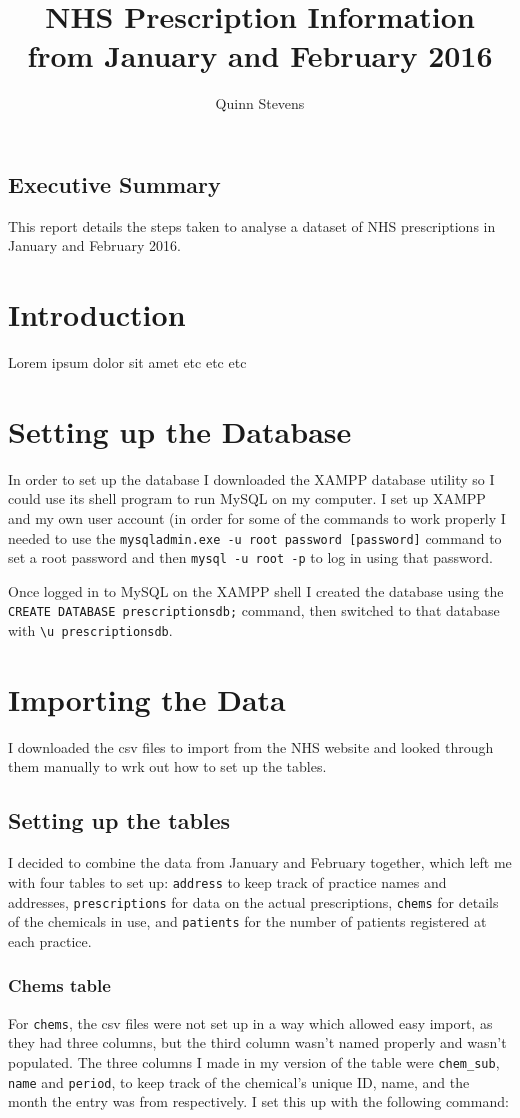 \documentclass{report}
\author{Quinn Stevens}
\title{NHS Prescription Information from January and February 2016}
\begin{document}
\maketitle
\section*{Executive Summary}
This report details the steps taken to analyse a dataset of NHS prescriptions in January and February 2016.
\tableofcontents
\chapter{Introduction}
Lorem ipsum dolor sit amet etc etc etc
\chapter{Setting up the Database}

In order to set up the database I downloaded the XAMPP database utility \cite{xampp} so I could use its shell program to run MySQL on my computer. I set up XAMPP and my own user account (in order for some of the commands to work properly I needed to use the \texttt{mysqladmin.exe -u root password [password]} command to set a root password and then \texttt{mysql -u root -p} to log in using that password.

Once logged in to MySQL on the XAMPP shell I created the database using the \texttt{CREATE DATABASE prescriptionsdb;} command, then switched to that database with \texttt{\textbackslash u prescriptionsdb}.
\chapter{Importing the Data}
I downloaded the csv files to import from the NHS website \cite{nhsprescriptiondata, nhspatientdata} and looked through them manually to wrk out how to set up the tables.

\section{Setting up the tables}
I decided to combine the data from January and February together, which left me with four tables to set up: \texttt{address} to keep track of practice names and addresses, \texttt{prescriptions} for data on the actual prescriptions, \texttt{chems} for details of the chemicals in use, and \texttt{patients} for the number of patients registered at each practice.

\subsection{Chems table}
For \texttt{chems}, the csv files were not set up in a way which allowed easy import, as they had three columns, but the third column wasn't named properly and wasn't populated. The three columns I made in my version of the table were \texttt{chem\_sub}, \texttt{name} and \texttt{period}, to keep track of the chemical's unique ID, name, and the month the entry was from respectively. I set this up with the following command:
\end{document}
